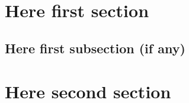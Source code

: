 \documentclass[12pt]{article}
\begin{document}
\thispagestyle{empty}


\begingroup
\hypersetup{linkcolor=black}

      

\setcounter{page}{1}
\pagestyle{plain}

\section{Here first section}

\subsection{Here first subsection (if any)}


\section{Here second section}





\newpage

\end{document}
